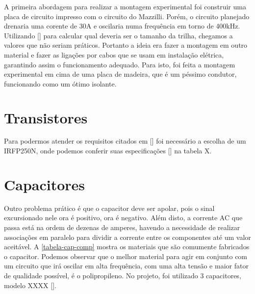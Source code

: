 A primeira abordagem para realizar a montagem experimental foi construir uma placa de circuito impresso com o circuito do Mazzilli. Porém, o circuito planejado drenaria uma corente de 30A e oscilaria numa frequência em torno de 400kHz. Utilizando [] para calcular qual deveria ser o tamanho da trilha, chegamos a valores que não seriam práticos. Portanto a ideia era fazer a montagem em outro material e fazer as ligações por cabos que se usam em instalação elétrica, garantindo assim o funcionamento adequado. Para isto, foi feita a montagem experimental em cima de uma placa de madeira, que é um péssimo condutor, funcionando como um ótimo isolante. 
\section{Transistores}
Para podermos atender os requisitos citados em [] foi necessário a escolha de um IRFP250N, onde podemos conferir suas especificações [] na tabela X.


\begin{table}[htb]
\end{table}


\section{Capacitores}
Outro problema prático é que o capacitor deve ser apolar, pois o sinal excursionado nele ora é positivo, ora é negativo. Além disto, a corrente AC que passa está na ordem de dezenas de amperes, havendo a necessidade de realizar associações em paralelo para dividir a corrente entre os componentes até um valor aceitável. A \ref{tabela-cap-comp} mostra os materiais que são comumente fabricados o capacitor. Podemos observar que o melhor material para agir em conjunto com um circuito que irá oscilar em alta frequência, com uma alta tensão e maior fator de qualidade possível, é o polipropileno. No projeto, foi utilizado 3 capacitores, modelo XXXX [].


